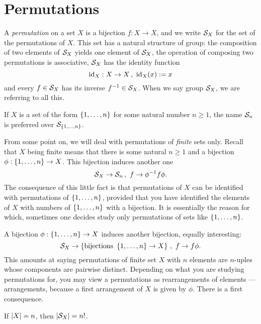 
\section{Permutations}

A {\em permutation} on a set \(X\) is a bijection \(f : X \to X\), and  we write \(\mathcal S_X\) for the set of the permutations of \(X\). This set has a natural structure of group: the composition of two elements of \(\mathcal S_X\) yields one element of \(\mathcal S_X\), the operation of composing two permutations is associative, \(\mathcal S_X\) has the identity function
\[\text{id}_X : X \to X\,, \ \text{id}_X(x) := x\]
and every \(f \in \mathcal S_X\) has its inverse \(f^{-1} \in \mathcal S_X\). When we say group \(\mathcal S_X\), we are referring to all this. %

If \(X\) is a set of the form \(\left\{1, \dots{}, n\right\}\) for some natural number \(n \ge 1\), the name \(\mathcal S_n\) is preferred over \(\mathcal S_{\left\{1, \dots{}, n\right\}}\). 

From some point on, we will deal with permutations of {\em finite} sets only. Recall that \(X\) being finite means that there is some natural \(n \ge 1\) and a bijection \(\phi : \left\{1, \dots{}, n\right\} \to X\). This bijection induces another one
\[\mathcal S_X \to \mathcal S_n\,, \ f \to \phi^{-1} f \phi .\]
The consequence of this little fact is that permutations of \(X\) can be identified with permutations of \(\left\{1, \dots{}, n\right\}\), provided that you have identified the elements of \(X\) with numbers of \(\left\{1, \dots{}, n\right\}\) with a bijection. It is essentially the reason for which, sometimes one decides study only permutations of sets like \(\left\{1, \dots{}, n\right\}\). 

A bijection \(\phi : \left\{1, \dots{}, n\right\} \to X\) induces another bijection, equally interesting:
%
\[\mathcal S_X \to \left\{\text{bijections } \left\{1, \dots{}, n\right\} \to X\right\}\,, \ f \to f \phi .\]
%
This amounts at saying permutations of finite set \(X\)  with \(n\) elements are \(n\)-uples whose components are pairwise distinct. Depending on what you are studying permutations for, you may view a permutations as rearrangements of elements --- arrangements, because a first arrangement of \(X\) is given by \(\phi\). There is a first consequence.

\begin{proposition}
If \(\left\lvert X\right\rvert = n\), then \(\left\lvert\mathcal S_X\right\rvert = n !\).
\end{proposition}


